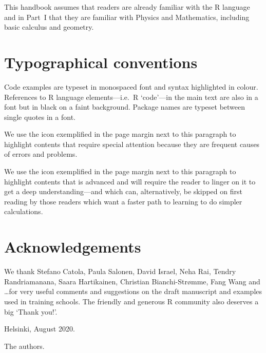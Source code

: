 This handbook assumes that readers are already familiar with the R language and in Part~I that they are familiar with Physics and Mathematics, including basic calculus and geometry.

\section{Typographical conventions}

Code examples are typeset in monospaced font and syntax highlighted in colour. References to R language elements---i.e.\ R `code'---in the main text are also in a  font but in black on a faint background. Package names are typeset between single quotes in a  font.

We\Attention{} use the icon exemplified in the page margin next to this paragraph to highlight contents that require special attention because they are frequent causes of errors and problems.

We\Advanced{} use the icon exemplified in the page margin next to this paragraph to highlight contents that is advanced and will require the reader to linger on it to get a deep understanding---and which can, alternatively, be skipped on first reading by those readers which want a faster path to learning to do simpler calculations.

\section{Acknowledgements}

We thank Stefano Catola, Paula Salonen, David Israel, Neha Rai, Tendry Randriamanana, Saara Hartikainen, Christian Bianchi-Str{\o}mme, Fang Wang and \ldots for very useful comments and suggestions on the draft manuscript and examples used in training schools. The friendly and generous R community also deserves a big `Thank you!'.

Helsinki, August 2020.

The authors. 